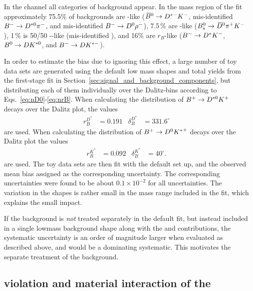 In the \D\kaon channel all categories of background appear. In the mass region of the \CP fit approximately 75.5\% of backgrounds are \Dz-like (${{\kern 0.18em\overline{\kern -0.18em B}}{}^0}\rightarrow{\ensuremath{{D}^{*-}}}{\ensuremath{{K}^-}}$, mis-identified ${{{B}^-}}\rightarrow{\ensuremath{{D}^{*0}}}{\ensuremath{{\pi}^-}}$, and mis-identified ${{{B}^-}}\rightarrow{\ensuremath{{D}^0}}\rho^-$), 7.5\,\% are \Dzb-like (${{B}^0_{s}}\rightarrow{\ensuremath{{\kern 0.18em\overline{\kern -0.18em D}}{}^0}}\pi^+{{K}^-}$), 1\,\% is 50/50 \Dz-\Dzb-like (mis-identified \Bz\to\D\rhoz), and 16\% are $r_B$-like (${{{B}^-}}\rightarrow{\ensuremath{{D}^*}}{\ensuremath{{K}^-}}$, ${{B}^0}\rightarrow{\ensuremath{D}}{\ensuremath{{K}^{*0}}}$, and ${{{B}^-}}\rightarrow{\ensuremath{D}}{\ensuremath{{K}^{*-}}}$). 

In order to estimate the bias due to ignoring this effect, a large number of toy data sets are generated using the default low mass shapes and total yields from the first-stage fit in Section~\ref{sec:signal_and_background_components}, but distributing each of them individually over the Dalitz-bins according to Eqs.~\eqref{eq:nD0}-\eqref{eq:nrB}. When calculating the distribution of ${{{B}^+}}\rightarrow{\ensuremath{{D}^{*0}}}{\ensuremath{{K}^+}}$ decays over the Dalitz plot, the values \cite{LHCb-CONF-2018-002}
\begin{align}
    r_B^{D^*} & = 0.191 & \delta_B^{D^*} & = 331.6^\circ
\end{align} are used.  When calculating the distribution of ${{{B}^+}}\rightarrow{\ensuremath{{D}^0}}{\ensuremath{{K}^*}}^+$ decays over the Dalitz plot the values \cite{LHCb-CONF-2018-002}
\begin{align}
        r_B^{K^*} & = 0.092 & \delta_B^{K^*} & = 40^\circ.
\end{align}  are used. The toy data sets are then fit with the default set up, and the observed mean bias assigned as the corresponding uncertainty. The corresponding uncertainties were found to be about $0.1\times 10^{-2}$ for all uncertainties. The variation in the shapes is rather small in the mass range included in the fit, which explains the small impact.

If the \Bs background is \emph{not} treated separately in the default fit, but instead included in a single lowmass background shape along with the \Bz and \Bpm contributions, the systematic uncertainty is an order of magnitude larger when evaluated as described above, and would be a dominating systematic. This motivates the separate treatment of the \Bs background.




\subsection{\texorpdfstring{\CP violation and material interaction of the \KS}
{CP violation and material interaction of the KS}} %
\label{sub:cp_violation_and_material_interaction_of_the_ks}

